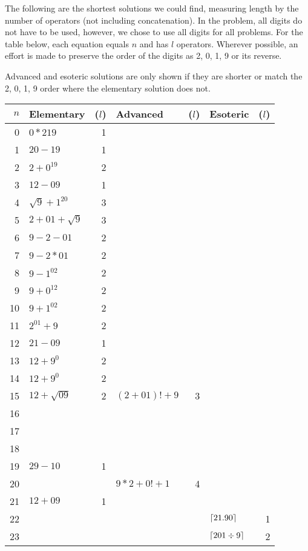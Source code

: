 The following are the shortest solutions we could find, measuring length by the number of operators (not including concatenation).
In the problem, all digits do not have to be used, however, we chose to use all digits for all problems.
For the table below, each equation equals $n$ and has $l$ operators.
Wherever possible, an effort is made to preserve the order of the digits as 2, 0, 1, 9 or its reverse.

Advanced and esoteric solutions are only shown if they are shorter or match the 2, 0, 1, 9 order where the elementary solution does not.

\begin{longtable}{r l r l r l r}
\toprule
$n$ & Elementary & ($l$) & Advanced & ($l$) & Esoteric & ($l$) \\ \midrule
\endhead%
0 & $0*219$ & 1 \\ \midrule
1 & $20-19$ & 1 \\ \midrule
2 & $2+0^{19}$ & 2 \\ \midrule
3 & $12-09$ & 1 \\ \midrule
4 & $\sqrt{9}+1^{20}$ & 3 \\ \midrule
5 & $2+01+\sqrt{9}$ & 3 \\ \midrule
6 & $9-2-01$ & 2 \\ \midrule
7 & $9-2*01$ & 2 \\ \midrule
8 & $9-1^{02}$ & 2 \\ \midrule
9 & $9+0^{12}$ & 2 \\ \midrule
\midrule
10 & $9+1^{02}$ & 2 \\ \midrule
11 & $2^{01}+9$ & 2 \\ \midrule
12 & $21-09$ & 1 \\ \midrule
13 & $12+9^0$ & 2 \\ \midrule
14 & $12+9^0$ & 2 \\ \midrule
15 & $12+\sqrt{09}$ & 2 & $(2+01)!+9$ & 3 \\ \midrule
16 & & \\ \midrule
17 & & \\ \midrule
18 & & \\ \midrule
19 & $29-10$ & 1 \\ \midrule
\midrule
20 & & & $9*2+0!+1$ & 4 \\ \midrule
21 & $12+09$ & 1 \\ \midrule
22 & & & & & $\lceil21.90\rceil$ & 1 \\ \midrule
23 & & & & & $\lceil201\div9\rceil$ & 2 \\ \midrule

\end{longtable}
